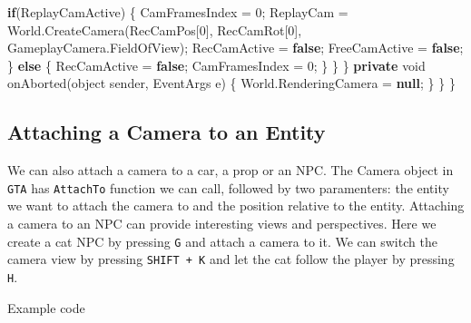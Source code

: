 \documentclass[
  openany]{book}
\newenvironment{Shaded}{\begin{snugshade}}{\end{snugshade}}
\newcommand{\DataTypeTok}[1]{\textcolor[rgb]{0.13,0.29,0.53}{#1}}
\newcommand{\DecValTok}[1]{\textcolor[rgb]{0.00,0.00,0.81}{#1}}
\newcommand{\FunctionTok}[1]{\textcolor[rgb]{0.00,0.00,0.00}{#1}}
\newcommand{\KeywordTok}[1]{\textcolor[rgb]{0.13,0.29,0.53}{\textbf{#1}}}
\newcommand{\NormalTok}[1]{#1}
\begin{document}
\begin{Shaded}
\begin{Highlighting}[]
                \KeywordTok{if}\NormalTok{(ReplayCamActive)}
\NormalTok{                \{}
\NormalTok{                    CamFramesIndex = }\DecValTok{0}\NormalTok{;}
\NormalTok{                    ReplayCam = World.}\FunctionTok{CreateCamera}\NormalTok{(RecCamPos[}\DecValTok{0}\NormalTok{], RecCamRot[}\DecValTok{0}\NormalTok{], GameplayCamera.}\FunctionTok{FieldOfView}\NormalTok{);}
\NormalTok{                    RecCamActive = }\KeywordTok{false}\NormalTok{;}
\NormalTok{                    FreeCamActive = }\KeywordTok{false}\NormalTok{;}
\NormalTok{                \}}
                \KeywordTok{else}
\NormalTok{                \{}
\NormalTok{                    RecCamActive = }\KeywordTok{false}\NormalTok{;}
\NormalTok{                    CamFramesIndex = }\DecValTok{0}\NormalTok{;}
\NormalTok{                \}}
\NormalTok{            \}}
\NormalTok{        \}}
        \KeywordTok{private} \DataTypeTok{void} \FunctionTok{onAborted}\NormalTok{(}\DataTypeTok{object}\NormalTok{ sender, EventArgs e)}
\NormalTok{        \{}
\NormalTok{            World.}\FunctionTok{RenderingCamera}\NormalTok{ = }\KeywordTok{null}\NormalTok{;}
\NormalTok{        \}}
\NormalTok{    \}}
\NormalTok{\}}


\end{Highlighting}
\end{Shaded}

\hypertarget{attaching-a-camera-to-an-entity}{%
\subsection*{Attaching a Camera to an Entity}\label{attaching-a-camera-to-an-entity}}

We can also attach a camera to a car, a prop or an NPC. The Camera object in \texttt{GTA} has \texttt{AttachTo} function we can call, followed by two paramenters: the entity we want to attach the camera to and the position relative to the entity.
Attaching a camera to an NPC can provide interesting views and perspectives. Here we create a cat NPC by pressing \texttt{G} and attach a camera to it. We can switch the camera view by pressing \texttt{SHIFT\ +\ K} and let the cat follow the player by pressing \texttt{H}.

Example code
\end{document}
